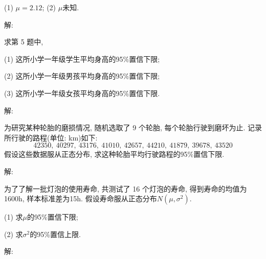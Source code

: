 \documentclass[standard]{ExBook}
\begin{document}
\begin{qitems}
\begin{bbox}
\begin{shaded}
(1) $\mu=2.12$; \qquad (2) $\mu$未知.
    \end{shaded}
    \end{bbox}

\vspace{-5em}

    \begin{bbox}
解: 
    \end{bbox}

\vspace{-5em}

    \begin{bbox}
    \begin{shaded}
        \qitem
求第 5 题中,

(1) 这所小学一年级学生平均身高的95\%置信下限;

(2) 这所小学一年级男孩平均身高的95\%置信下限;

(3) 这所小学一年级女孩平均身高的95\%置信下限.
    \end{shaded}
    \end{bbox}

\vspace{-5em}

    \begin{bbox}
解: 
    \end{bbox}

\vspace{-5em}

    \begin{bbox}
    \begin{shaded}
        \qitem
为研究某种轮胎的磨损情况, 随机选取了 9 个轮胎, 每个轮胎行驶到磨坏为止. 记录所行驶的路程(单位: km)如下:
$$42350,\ 40297,\ 43176,\ 41010,\ 42657,\ 44210,\ 41879,\ 39678,\ 43520$$
假设这些数据服从正态分布, 求这种轮胎平均行驶路程的95\%置信下限.
    \end{shaded}
    \end{bbox}

\vspace{-5em}

    \begin{bbox}
解: 
    \end{bbox}

\vspace{-5em}

    \begin{bbox}
    \begin{shaded}
        \qitem
为了了解一批灯泡的使用寿命, 共测试了 16 个灯泡的寿命, 得到寿命的均值为1600h, 样本标准差为15h. 假设寿命服从正态分布$N(\mu,\sigma^2)$.

(1) 求$\mu$的95\%置信下限;

(2) 求$\sigma^2$的95\%置信上限.
    \end{shaded}
    \end{bbox}

\vspace{-5em}

    \begin{bbox}
解: 
    \end{bbox}
\end{qitems}
\end{document}
